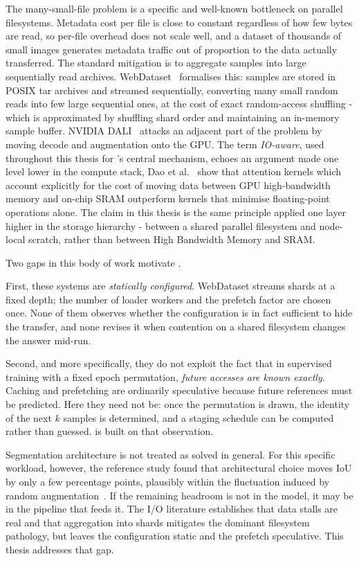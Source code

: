The many-small-file problem is a specific and well-known bottleneck on parallel
filesystems.
Metadata cost per file is close to constant regardless of how few bytes are read,
so per-file overhead does not scale well, and a dataset of thousands of small images
generates metadata traffic out of proportion to the data actually transferred.
The standard mitigation is to aggregate samples into large sequentially read
archives.
WebDataset~\cite{Aizman19} formalises this: samples are stored in POSIX tar archives
and streamed sequentially, converting many small random reads into few large
sequential ones, at the cost of exact random-access shuffling - which is
approximated by shuffling shard order and maintaining an in-memory sample buffer.
NVIDIA DALI~\cite{DALI} attacks an adjacent part of the problem by moving decode and
augmentation onto the GPU.
The term \emph{IO-aware}, used throughout this thesis for \pads{}'s central
mechanism, echoes an argument made one level lower in the compute stack, Dao et
al.~\cite{Dao22} show that attention kernels which account explicitly for the cost
of moving data between GPU high-bandwidth memory and on-chip SRAM outperform
kernels that minimise floating-point operations alone.
The claim in this thesis is the same principle applied one layer higher in the
storage hierarchy - between a shared parallel filesystem and node-local scratch,
rather than between High Bandwidth Memory and SRAM.

Two gaps in this body of work motivate \pads{}.

First, these systems are \emph{statically configured}.
WebDataset streams shards at a fixed depth; the number of loader workers and the
prefetch factor are chosen once.
None of them observes whether the configuration is in fact sufficient to hide the
transfer, and none revises it when contention on a shared filesystem changes the
answer mid-run.

Second, and more specifically, they do not exploit the fact that in supervised
training with a fixed epoch permutation, \emph{future accesses are known exactly}.
Caching and prefetching are ordinarily speculative because future references must be
predicted.
Here they need not be: once the permutation is drawn, the identity of the next $k$
samples is determined, and a staging schedule can be computed rather than guessed.
\pads{} is built on that observation.


Segmentation architecture is not treated as solved in general.  For this specific
workload, however, the reference study found that architectural choice moves IoU by only
a few percentage points, plausibly within the fluctuation induced by random
augmentation~\cite{Casini23}.
If the remaining headroom is not in the model, it may be in the pipeline that feeds
it.
The I/O literature establishes that data stalls are real and that aggregation into
shards mitigates the dominant filesystem pathology, but leaves the configuration
static and the prefetch speculative.
This thesis addresses that gap.
